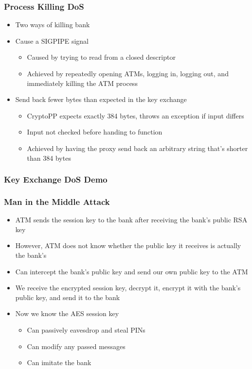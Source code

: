 \documentclass{beamer}
\begin{document}
\begin{frame}[fragile]
\frametitle{Process Killing DoS}
\begin{itemize}
\item Two ways of killing bank
\item Cause a SIGPIPE signal
\begin{itemize}
\item Caused by trying to read from a closed descriptor
\item Achieved by repeatedly opening ATMs, logging in, logging out, and immediately killing the ATM process
\end{itemize}
\item Send back fewer bytes than expected in the key exchange
\begin{itemize}
\item CryptoPP expects exactly 384 bytes, throws an exception if input differs
\item Input not checked before handing to function
\item Achieved by having the proxy send back an arbitrary string that's shorter than 384 bytes
\end{itemize}
\end{itemize}
\end{frame}

\begin{frame}[fragile]
\frametitle{Key Exchange DoS Demo}
\end{frame}

\begin{frame}[fragile]
\frametitle{Man in the Middle Attack}
\begin{itemize}
\item ATM sends the session key to the bank after receiving the bank's public RSA key
\item However, ATM does not know whether the public key it receives is actually the bank's
\item Can intercept the bank's public key and send our own public key to the ATM
\item We receive the encrypted session key, decrypt it, encrypt it with the bank's public key, and send it to the bank
\item Now we know the AES session key
\begin{itemize}
\item Can passively eavesdrop and steal PINs
\item Can modify any passed messages
\item Can imitate the bank
\end{itemize}
\end{itemize}
\end{frame}
\end{document}
